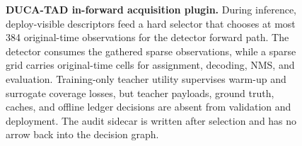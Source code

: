 \begin{figure}[t]
{}
\caption{\textbf{DUCA-TAD in-forward acquisition plugin.} During inference, deploy-visible descriptors feed a hard selector that chooses at most 384 original-time observations for the detector forward path. The detector consumes the gathered sparse observations, while a sparse grid carries original-time cells for assignment, decoding, NMS, and evaluation. Training-only teacher utility supervises warm-up and surrogate coverage losses, but teacher payloads, ground truth, caches, and offline ledger decisions are absent from validation and deployment. The audit sidecar is written after selection and has no arrow back into the decision graph.}
\label{fig:architecture}
\end{figure}
